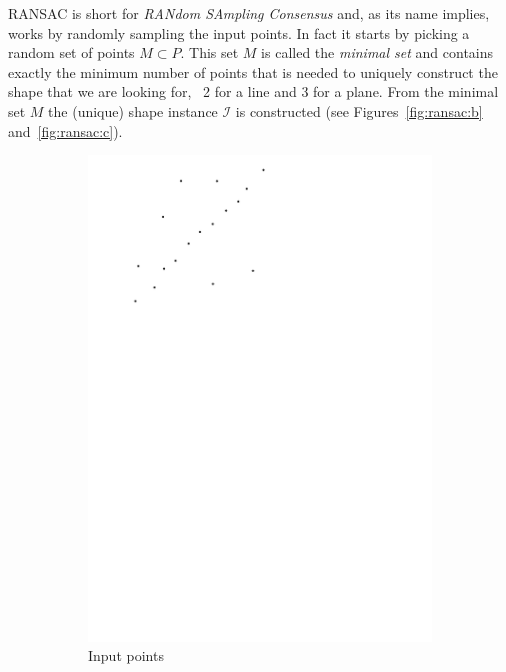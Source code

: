 RANSAC is short for \emph{RANdom SAmpling Consensus} and, as its name implies, works by randomly sampling the input points.
In fact it starts by picking a random set of points $M \subset P$. 
This set $M$ is called the \emph{minimal set} and contains exactly the minimum number of points that is needed to uniquely construct the shape that we are looking for, \eg\ 2 for a line and 3 for a plane. 
From the minimal set $M$ the (unique) shape instance $\mathcal{I}$ is constructed (see Figures~\ref{fig:ransac:b} and~\ref{fig:ransac:c}).
\begin{figure}
	\centering
	\begin{subfigure}[b]{0.24\linewidth}
		\centering
		\includegraphics[width=\textwidth,page=1]{ransac.pdf}
		\caption{Input points}\label{fig:ransac:a}
	\end{subfigure}
	\begin{subfigure}[b]{0.24\linewidth}

\end{subfigure}
\end{figure}
